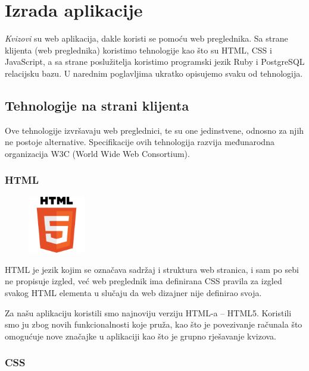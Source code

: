 \documentclass{scrreprt}
\begin{document}
\section{Izrada aplikacije}

\emph{Kvizovi} su web aplikacija, dakle koristi se pomoću web preglednika. Sa
strane klijenta (web preglednika) koristimo tehnologije kao što su HTML, CSS i
JavaScript, a sa strane poslužitelja koristimo programski jezik Ruby i
PostgreSQL relacijsku bazu. U narednim poglavljima ukratko opisujemo svaku od
tehnologija.

\subsection{Tehnologije na strani klijenta}

Ove tehnologije izvršavaju web preglednici, te su one jedinstvene, odnosno za
njih ne postoje alternative. Specifikacije ovih tehnologija razvija međunarodna
organizacija W3C (World Wide Web Consortium).

\subsubsection{HTML}

\begin{figure}
  \vspace{-10pt}
  \includegraphics[width=2.5cm]{logos/html}
  \vspace{-30pt}
\end{figure}

HTML je jezik kojim se označava sadržaj i struktura web stranica, i sam po sebi
ne propisuje izgled, već web preglednik ima definirana CSS pravila za izgled
svakog HTML elementa u slučaju da web dizajner nije definirao svoja.\cite{html}

Za našu aplikaciju koristili smo najnoviju verziju HTML-a -- HTML5. Koristili
smo ju zbog novih funkcionalnosti koje pruža, kao što je povezivanje računala
što omogućuje nove značajke u aplikaciji kao što je grupno rješavanje kvizova.

\subsubsection{CSS}
\end{document}
